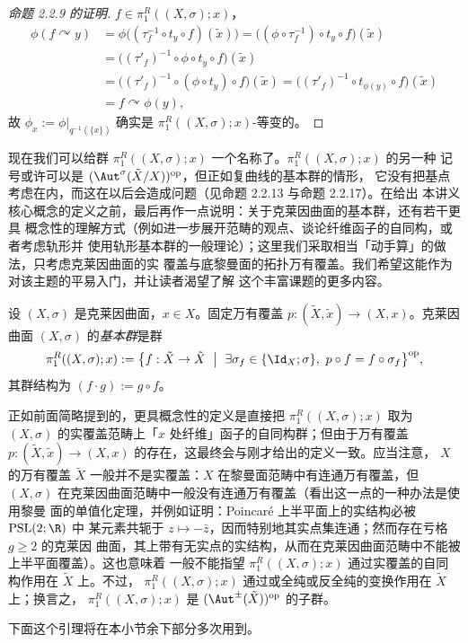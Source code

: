 \begin{proof}[命题 2.2.9 的证明]
$f\in\pi^R_1((X,\sigma);x)$，
\[
\begin{aligned}
\phi(f\curvearrowright y)
&=\phi\bigl((\tau_f^{-1}\circ t_y\circ f)(\tilde x)\bigr)
=\bigl((\phi\circ\tau_f^{-1})\circ t_y\circ f\bigr)(\tilde x)\\
&=\bigl((\tau'_f)^{-1}\circ\phi\circ t_y\circ f\bigr)(\tilde x)\\
&=\bigl((\tau'_f)^{-1}\circ(\phi\circ t_y)\circ f\bigr)(\tilde x)
=\bigl((\tau'_f)^{-1}\circ t_{\phi(y)}\circ f\bigr)(\tilde x)\\
&=f\curvearrowright\phi(y),
\end{aligned}
\]
故 $\phi_x:=\phi|_{q^{-1}(\{x\})}$ 确实是 $\pi^R_1((X,\sigma);x)$-等变的。
\end{proof}

现在我们可以给群 $\pi^R_1((X,\sigma);x)$ 一个名称了。$\pi^R_1((X,\sigma);x)$ 的另一种
记号或许可以是 $(\Aut^\sigma(\tilde X/X))^{\mathrm{op}}$，但正如复曲线的基本群的情形，
它没有把基点考虑在内，而这在以后会造成问题（见命题 2.2.13 与命题 2.2.17）。在给出
本讲义核心概念的定义之前，最后再作一点说明：关于克莱因曲面的基本群，还有若干更具
概念性的理解方式（例如进一步展开范畴的观点、谈论纤维函子的自同构，或者考虑轨形并
使用轨形基本群的一般理论）；这里我们采取相当「动手算」的做法，只考虑克莱因曲面的实
覆盖与底黎曼面的拓扑万有覆盖。我们希望这能作为对该主题的平易入门，并让读者渴望了解
这个丰富课题的更多内容。

\begin{definition}[实曲线的基本群]\label{def:2.2.10}
设 $(X,\sigma)$ 是克莱因曲面，$x\in X$。固定万有覆盖
$p:(\tilde X,\tilde x)\to(X,x)$。克莱因曲面 $(X,\sigma)$ 的\emph{基本群}是群
\[
\pi^R_1((X,\sigma);x):=
\bigl\{f:\tilde X\to\tilde X\ \bigm|\ \exists\sigma_f\in\{\Id_X;\sigma\},\
p\circ f=f\circ\sigma_f\bigr\}^{\mathrm{op}},
\]
其群结构为 $(f\cdot g):=g\circ f$。
\end{definition}

正如前面简略提到的，更具概念性的定义是直接把 $\pi^R_1((X,\sigma);x)$ 取为
$(X,\sigma)$ 的实覆盖范畴上「$x$ 处纤维」函子的自同构群；但由于万有覆盖
$p:(\tilde X,\tilde x)\to(X,x)$ 的存在，这最终会与刚才给出的定义一致。应当注意，
$X$ 的万有覆盖 $\tilde X$ 一般并不是实覆盖：$X$ 在黎曼面范畴中有连通万有覆盖，但
$(X,\sigma)$ 在克莱因曲面范畴中一般没有连通万有覆盖（看出这一点的一种办法是使用黎曼
面的单值化定理，并例如证明：Poincaré 上半平面上的实结构必被 $\mathrm{PSL}(2;\R)$ 中
某元素共轭于 $z\mapsto-\bar z$，因而特别地其实点集连通；然而存在亏格 $g\ge2$ 的克莱因
曲面，其上带有无实点的实结构，从而在克莱因曲面范畴中不能被上半平面覆盖）。这也意味着
一般不能指望 $\pi^R_1((X,\sigma);x)$ 通过实覆盖的自同构作用在 $\tilde X$ 上。不过，
$\pi^R_1((X,\sigma);x)$ 通过或全纯或反全纯的变换作用在 $\tilde X$ 上；换言之，
$\pi^R_1((X,\sigma);x)$ 是 $(\Aut^{\pm}(\tilde X))^{\mathrm{op}}$ 的子群。

下面这个引理将在本小节余下部分多次用到。
